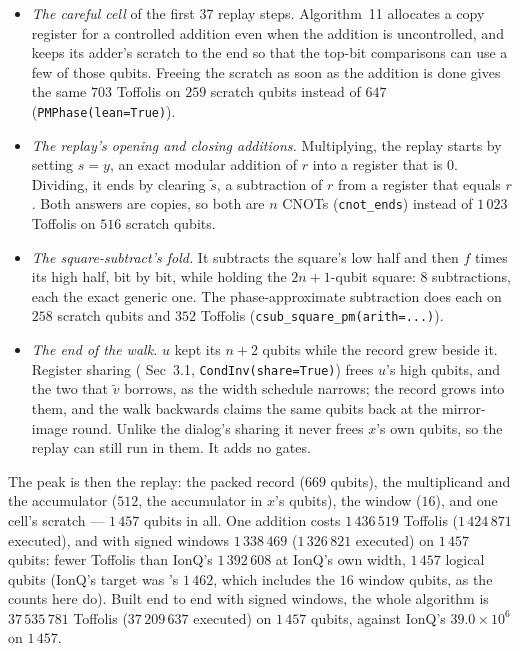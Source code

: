 \documentclass[11pt]{article}
\theoremstyle{plain}
\theoremstyle{remark}
\begin{document}
\begin{itemize}\setlength\itemsep{1pt}
\item \emph{The careful cell} of the first $37$ replay steps. Algorithm~11 allocates a copy
register for a controlled addition even when the addition is uncontrolled, and keeps its adder's
scratch to the end so that the top-bit comparisons can use a few of those qubits. Freeing the scratch
as soon as the addition is done gives the same $703$ Toffolis on $259$ scratch
qubits instead of $647$ (\texttt{PMPhase(lean=True)}).
\item \emph{The replay's opening and closing additions.} Multiplying, the replay starts by setting
$s=y$, an exact modular addition of $r$ into a register that is $0$. Dividing, it ends by clearing
$\tilde s$, a subtraction of $r$ from a register that equals $r$. Both answers are copies, so both
are $n$ CNOTs (\texttt{cnot\_ends}) instead of $1\,023$ Toffolis on $516$ scratch
qubits.
\item \emph{The square-subtract's fold.} It subtracts the square's low half and then $f$ times its
high half, bit by bit, while holding the $2n+1$-qubit square: $8$ subtractions, each the
exact generic one. The phase-approximate subtraction does each on $258$ scratch qubits and
$352$ Toffolis (\texttt{csub\_square\_pm(arith=...)}).
\item \emph{The end of the walk.} $u$ kept its $n+2$ qubits while the record grew beside it.
Register sharing (\cite{ec:schrott26} Sec~3.1, \texttt{CondInv(share=True)}) frees $u$'s high
qubits, and the two that $\tilde v$ borrows, as the width schedule narrows; the record grows into them,
and the walk backwards claims the same qubits back at the mirror-image round. Unlike the dialog's
sharing it never frees $x$'s own qubits, so the replay can still run in them. It adds no gates.
\end{itemize}

\noindent
The peak is then the replay: the packed record ($669$ qubits), the multiplicand and the
accumulator ($512$, the accumulator in $x$'s qubits), the window ($16$), and one cell's scratch ---
$1\,457$ qubits in all. One addition costs $1\,436\,519$ Toffolis ($1\,424\,871$ executed),
and with signed windows $1\,338\,469$ ($1\,326\,821$ executed) on $1\,457$ qubits: fewer
Toffolis than IonQ's $1\,392\,608$ at IonQ's own width, $1\,457$ logical qubits (IonQ's target
was \cite{ec:schrott26}'s $1\,462$, which includes the $16$ window qubits, as the counts here do). Built end to end with
signed windows, the whole algorithm is $37\,535\,781$ Toffolis ($37\,209\,637$ executed) on
$1\,457$ qubits, against IonQ's $39.0\times10^6$ on $1\,457$.
\end{document}
